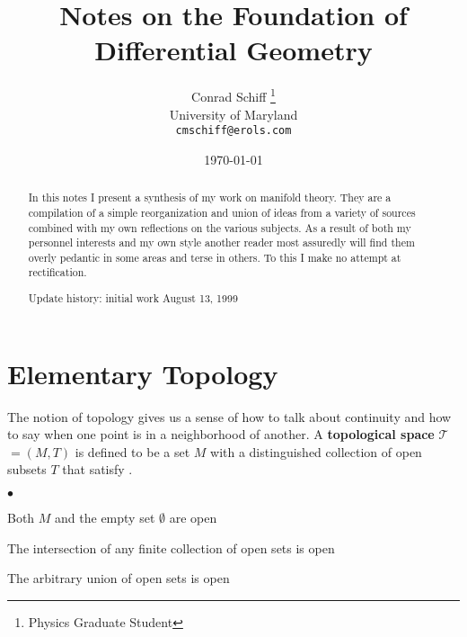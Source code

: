 \documentclass[twocolumn]{article}
\newcounter{bean}
\begin{document}
%
%
\title{Notes on the Foundation of Differential Geometry}
\author{Conrad Schiff \thanks{Physics Graduate Student} \\
        University of Maryland\\
	  \texttt{cmschiff@erols.com}}
\date{\today}
\maketitle


%
%
\begin{abstract}
In this notes I present a synthesis of my work on manifold theory.  
They are a compilation of a simple reorganization and union of ideas 
from a variety of sources combined with my own reflections on the 
various subjects.  As a result of both my personnel interests and my 
own style another reader most assuredly will find them overly pedantic 
in some areas and terse in others.  To this I make no attempt at 
rectification.

Update history: initial work August 13, 1999
\end{abstract}

\section{Elementary Topology}\label{S:elem_top}

The notion of topology gives us a sense of how to talk about 
continuity and how to say when one point is in a neighborhood of 
another.  A \textbf{topological space} $\mathcal{T}$ $= (M, T)$ is 
defined to be a set $M$ with a distinguished collection of open 
subsets $T$ that satisfy 
\cite{bryant,frankel,lipschutz,love_rund,munkres,schutz80,wald}.

\begin{list}
   {$\bullet$}{
    \setlength{\rightmargin}{\leftmargin}}
	\item Both $M$ and the empty set $\emptyset$ are open
 	\item The intersection of any finite collection of open sets               
          is open
	\item The arbitrary union of open sets is open
\end{list}
\end{document}
